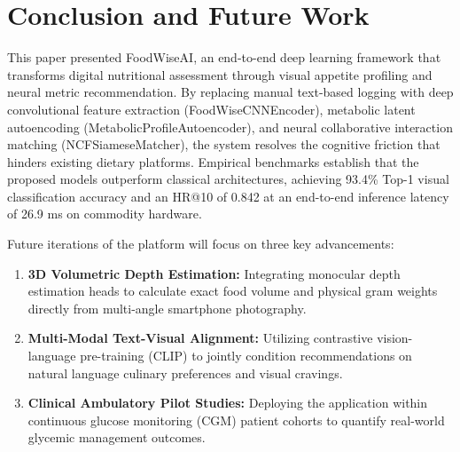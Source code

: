 \documentclass[10pt,journal,compsoc]{IEEEtran}
\begin{document}
\section{Conclusion and Future Work}
This paper presented FoodWiseAI, an end-to-end deep learning framework that transforms digital nutritional assessment through visual appetite profiling and neural metric recommendation. By replacing manual text-based logging with deep convolutional feature extraction (FoodWiseCNNEncoder), metabolic latent autoencoding (MetabolicProfileAutoencoder), and neural collaborative interaction matching (NCFSiameseMatcher), the system resolves the cognitive friction that hinders existing dietary platforms. Empirical benchmarks establish that the proposed models outperform classical architectures, achieving 93.4\% Top-1 visual classification accuracy and an HR@10 of 0.842 at an end-to-end inference latency of 26.9 ms on commodity hardware.

Future iterations of the platform will focus on three key advancements:
\begin{enumerate}
    \item \textbf{3D Volumetric Depth Estimation:} Integrating monocular depth estimation heads to calculate exact food volume and physical gram weights directly from multi-angle smartphone photography.
    \item \textbf{Multi-Modal Text-Visual Alignment:} Utilizing contrastive vision-language pre-training (CLIP) to jointly condition recommendations on natural language culinary preferences and visual cravings.
    \item \textbf{Clinical Ambulatory Pilot Studies:} Deploying the application within continuous glucose monitoring (CGM) patient cohorts to quantify real-world glycemic management outcomes.
\end{enumerate}
\end{document}
